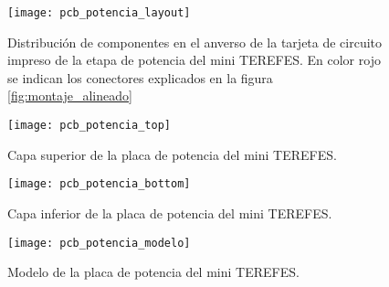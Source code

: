 \begin{figure}[!htb]
\centering
\texttt{[image: pcb\_potencia\_layout]}
  \caption{Distribución de componentes en el anverso de la tarjeta de circuito impreso de la etapa de potencia del mini TEREFES. En color rojo se indican los conectores explicados en la figura \ref{fig:montaje_alineado}}\label{fig:pcb_potencia_layout}
\end{figure}

\begin{figure}[!htb]
\centering
\texttt{[image: pcb\_potencia\_top]}
  \caption{Capa superior de la placa de potencia del mini TEREFES.}\label{fig:pcb_potencia_top}
\end{figure}

\begin{figure}[!htb]
\centering
\texttt{[image: pcb\_potencia\_bottom]}
  \caption{Capa inferior de la placa de potencia del mini TEREFES.}\label{fig:pcb_potencia_bottom}
\end{figure}

\begin{figure}[!htb]
\centering
\texttt{[image: pcb\_potencia\_modelo]}
  \caption{Modelo de la placa de potencia del mini TEREFES.}\label{fig:pcb_potencia_modelo}
\end{figure}